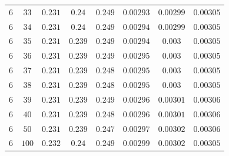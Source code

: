 \begin{table}[H]
\begin{tabular}{cccccccc}
$6$ & $33$ & $0.231$ & $0.24$ & $0.249$ & $0.00293$ & $0.00299$ & $0.00305$\\
$6$ & $34$ & $0.231$ & $0.24$ & $0.249$ & $0.00294$ & $0.00299$ & $0.00305$\\
$6$ & $35$ & $0.231$ & $0.239$ & $0.249$ & $0.00294$ & $0.003$ & $0.00305$\\
$6$ & $36$ & $0.231$ & $0.239$ & $0.249$ & $0.00295$ & $0.003$ & $0.00305$\\
$6$ & $37$ & $0.231$ & $0.239$ & $0.248$ & $0.00295$ & $0.003$ & $0.00305$\\
$6$ & $38$ & $0.231$ & $0.239$ & $0.248$ & $0.00295$ & $0.003$ & $0.00305$\\
$6$ & $39$ & $0.231$ & $0.239$ & $0.249$ & $0.00296$ & $0.00301$ & $0.00306$\\
$6$ & $40$ & $0.231$ & $0.239$ & $0.248$ & $0.00296$ & $0.00301$ & $0.00306$\\
$6$ & $50$ & $0.231$ & $0.239$ & $0.247$ & $0.00297$ & $0.00302$ & $0.00306$\\
$6$ & $100$ & $0.232$ & $0.24$ & $0.249$ & $0.00299$ & $0.00302$ & $0.00305$\\
\end{tabular}
\end{table}
 